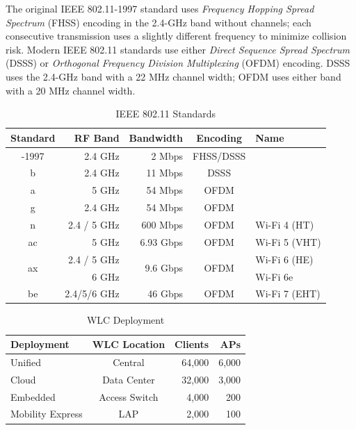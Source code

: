 \documentclass[12pt]{article}
\newcommand{\mr}[2]{\multirow{#1}{*}{#2}}
\begin{document}
	The original IEEE 802.11-1997 standard uses \textit{Frequency Hopping Spread Spectrum} (FHSS) encoding in the 2.4-GHz band without channels; each consecutive transmission uses a slightly different frequency to minimize collision risk. Modern IEEE 802.11 standards use either \textit{Direct Sequence Spread Spectrum} (DSSS) or \textit{Orthogonal Frequency Division Multiplexing} (OFDM) encoding. DSSS uses the 2.4-GHz band with a 22 MHz channel width; OFDM uses either band with a 20 MHz channel width.

	\begin{table}[H]
	\centering
	\caption{IEEE 802.11 Standards \label{tab:802.11 STANDARDS}}
	\begin{tabular}{@{} c r r c l @{}}\hline
	\textbf{Standard}	& \textbf{RF Band}	& \textbf{Bandwidth}	& \textbf{Encoding}	& \textbf{Name}\\\hline
	-1997			& 2.4 GHz			& 2 Mbps			& FHSS/DSSS\\\hline
	b 			& 2.4 GHz 			& 11 Mbps			& DSSS\\\hline
	a 			& 5 GHz			& 54 Mbps 			& OFDM\\\hline
	g 			& 2.4 GHz			& 54 Mbps 			& OFDM\\\hline
	n 			& 2.4 / 5 GHz		& 600 Mbps		& OFDM 			& Wi-Fi 4 (HT)\\\hline
	ac 			& 5 GHz			& 6.93 Gbps		& OFDM			& Wi-Fi 5 (VHT)\\\hline
	\mr{2}{ax}		& 2.4 / 5 GHz		& \mr{2}{9.6 Gbps}	& \mr{2}{OFDM}		& Wi-Fi 6 (HE)\\
				& 6 GHz			&				& 				& Wi-Fi 6e\\\hline
	be 			& 2.4/5/6 GHz		& 46 Gbps			& OFDM			& Wi-Fi 7 (EHT)\\\hline
	\end{tabular}\end{table}

	\begin{table}[H]
	\centering
	\caption{WLC Deployment \label{tab:WLC DEPLOYMENT}}
	\begin{tabular}{@{} l c r r @{}}\hline
	\textbf{Deployment}	& \textbf{WLC Location}	& \textbf{Clients}		& \textbf{APs}\\\hline
	Unified			& Central				& 64,000			& 6,000\\
	Cloud			& Data Center 			& 32,000			& 3,000\\
	Embedded			& Access Switch			& 4,000 			& 200\\
	Mobility Express		& LAP 				& 2,000			& 100\\\hline
	\end{tabular}\end{table}
\end{document}
